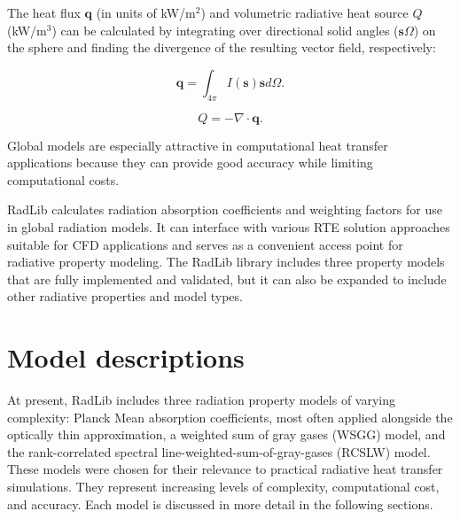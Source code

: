 \documentclass[preprint,12pt]{elsarticle}
\newcounter{bla}
\begin{document}
The heat flux $\mathbf{q}$ (in units of kW/m$^2$) and volumetric radiative heat source $Q$ (kW/m$^3$) can be calculated by integrating over directional solid angles ($\mathbf{s}\Omega$) on the sphere and finding the divergence of the resulting vector field, respectively:
%
\begin{linenomath}
\begin{equation}
    \mathbf{q} = \int_{4\pi}I(\mathbf{s})\mathbf{s}d\Omega.
\end{equation}
\end{linenomath}
%
\begin{linenomath}
\begin{equation}
    Q = -\nabla\cdot\mathbf{q}.
\end{equation}
\end{linenomath}
%
Global models are especially attractive in computational heat transfer applications because they can provide good accuracy while limiting computational costs.

RadLib calculates radiation absorption coefficients and weighting factors for use in global radiation models. It can interface with various RTE solution approaches suitable for CFD applications and serves as a convenient access point for radiative property modeling. The RadLib library includes three property models that are fully implemented and validated, but it can also be expanded to include other radiative properties and model types.


\section{Model descriptions} \label{s:models}

At present, RadLib includes three radiation property models of varying complexity: Planck Mean absorption coefficients, most often applied alongside the optically thin approximation, a weighted sum of gray gases (WSGG) model, and the rank-correlated spectral line-weighted-sum-of-gray-gases (RCSLW) model. These models were chosen for their relevance to practical radiative heat transfer simulations. They represent increasing levels of complexity, computational cost, and accuracy. Each model is discussed in more detail in the following sections.
\end{document}
